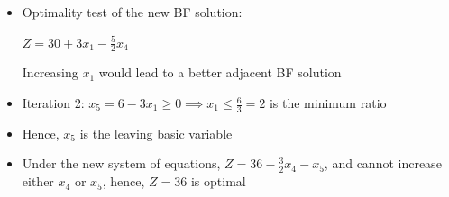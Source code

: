 \documentclass[12pt]{article}
\begin{document}
  \begin{itemize}
  \item Optimality test of the new BF solution: 

    $Z = 30 + 3 x_1 - \frac{5}{2}x_4$

    Increasing $x_1$ would lead to a better adjacent BF solution
  \item Iteration 2: $x_5 = 6 - 3 x_1 \ge 0 \implies x_1 \le \frac{6}{3} = 2$ is the minimum ratio
  \item Hence, $x_5$ is the leaving basic variable
  \item Under the new system of equations, $Z=36-\frac{3}{2}x_4-x_5$, and cannot increase either $x_4$ or $x_5$, hence, $Z=36$ is optimal
  \end{itemize}
\end{document}
